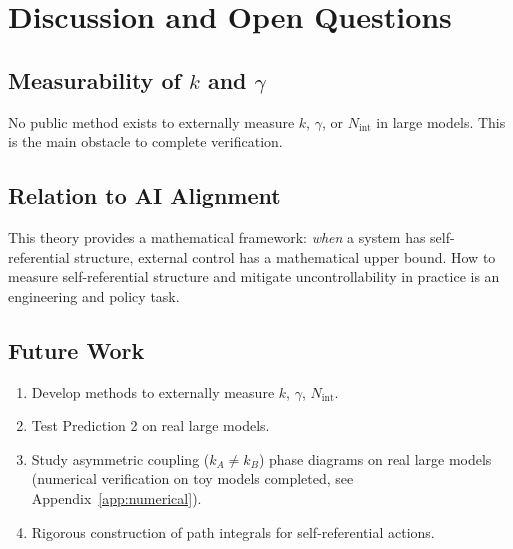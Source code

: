 \documentclass[12pt,a4paper]{article}
\theoremstyle{definition}
\newcommand{\Nint}{N_{\mathrm{int}}}
\begin{document}
\section{Discussion and Open Questions}
\label{sec:discussion}

\subsection{Measurability of $k$ and $\gamma$}

No public method exists to externally measure $k$, $\gamma$, or $\Nint$ in large models. This is the main obstacle to complete verification.

\subsection{Relation to AI Alignment}

This theory provides a mathematical framework: \emph{when} a system has self-referential structure, external control has a mathematical upper bound. How to measure self-referential structure and mitigate uncontrollability in practice is an engineering and policy task.

\subsection{Future Work}

\begin{enumerate}[leftmargin=*]
\item Develop methods to externally measure $k$, $\gamma$, $\Nint$.
\item Test Prediction 2 on real large models.
\item Study asymmetric coupling ($k_A \neq k_B$) phase diagrams on real large models (numerical verification on toy models completed, see Appendix~\ref{app:numerical}).
\item Rigorous construction of path integrals for self-referential actions.
\end{enumerate}
\end{document}
